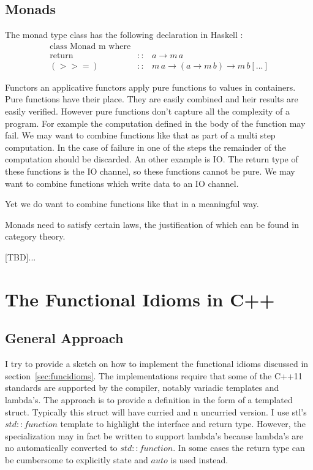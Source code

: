\documentclass[12pt,fleqn]{article}
\begin{document}
%
%
%
\subsection{Monads}
\label{subsec:monad}
%
%


The monad type class has the following declaration in Haskell :
\begin{eqnarray*}
\mbox{class Monad m where} \\
\mbox{return} &::& a \rightarrow m \, a \\
(>>=) &::& m \, a \rightarrow ( a \rightarrow m \, b) \rightarrow m \, b
[...] 
\end{eqnarray*}

Functors an applicative functors apply pure functions to values in containers.
Pure functions have their place. 
They are easily combined and heir results are easily verified.
However pure functions don't capture all the complexity of a program.
For example the computation defined in the body of the function may fail.
We may want to combine functions like that as part of a multi step computation. 
In the case of failure in one of the steps the remainder of the computation should be discarded.
An other example is IO.
The return type of these functions is the IO channel, so these functions cannot be pure.
We may want to combine functions which write data to an IO channel.

Yet we do want  to combine functions like that in a meaningful way. 

Monads need to satisfy certain laws, the justification of which can be found in category theory.

[TBD]...


%
%
\section{The Functional Idioms in C++}
%
%
%

\subsection{General Approach}

I try to provide a sketch on how to implement the functional idioms discussed in section~\ref{sec:funcidioms}.
The implementations require that some of the C++11 standards are supported by the compiler, notably variadic templates and lambda's.
The approach is to provide a definition in the form of a templated struct. 
Typically this struct will have curried and n uncurried version.
I use stl's $std::function$ template to highlight the interface and return type. 
However, the specialization may in fact be written to support lambda's because lambda's are no automatically converted to
$std::function$. 
In some cases the return type can be cumbersome to explicitly state and $auto$ is used instead.
\end{document}
